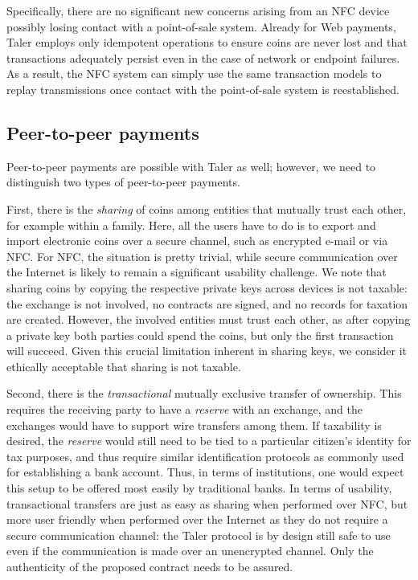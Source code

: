 \documentclass{IEEEtran}
\begin{document}
Specifically, there are no significant new concerns arising from an
NFC device possibly losing contact with a point-of-sale system.
Already for Web payments, Taler employs only idempotent operations to
ensure coins are never lost and that transactions adequately persist
even in the case of network or endpoint failures.  As a result, the
NFC system can simply use the same transaction models to replay
transmissions once contact with the point-of-sale system is
reestablished.


\subsection{Peer-to-peer payments}

Peer-to-peer payments are possible with Taler as well; however,
we need to distinguish two types of peer-to-peer payments.

First, there is the {\em sharing} of coins among entities that
mutually trust each other, for example within a family.  Here, all the
users have to do is to export and import electronic coins over a
secure channel, such as encrypted e-mail or via NFC.  For NFC, the
situation is pretty trivial, while secure communication over the
Internet is likely to remain a significant usability challenge.  We
note that sharing coins by copying the respective private keys across
devices is not taxable: the exchange is not involved, no contracts are
signed, and no records for taxation are created.  However, the
involved entities must trust each other, as after copying a private
key both parties could spend the coins, but only the first transaction
will succeed.  Given this crucial limitation
inherent in sharing keys, we consider it ethically acceptable that
sharing is not taxable.

Second, there is the {\em transactional} mutually exclusive transfer
of ownership.  This requires the receiving party to have a {\em
reserve} with an exchange, and the exchanges would have to support
wire transfers among them.  If taxability is desired, the {\em
reserve} would still need to be tied to a particular citizen's
identity for tax purposes, and thus require similar identification
protocols as commonly used for establishing a bank account. Thus, in
terms of institutions, one would expect this setup to be offered most
easily by traditional banks.  In terms of usability, transactional
transfers are just as easy as sharing when performed over NFC, but
more user friendly when performed over the Internet as they do not
require a secure communication channel: the Taler protocol is by
design still safe to use even if the communication is made over an
unencrypted channel. Only the authenticity of the proposed contract
needs to be assured.
\end{document}
